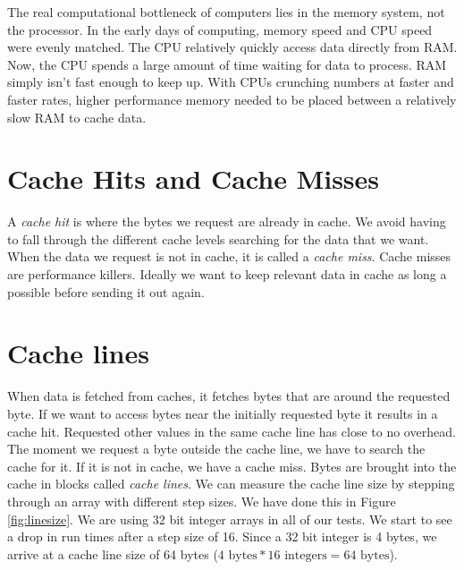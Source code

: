 
The real computational bottleneck of computers lies in the memory system, not the processor.  
In the early days of computing, memory speed and CPU speed were evenly matched.  
The CPU relatively quickly access data directly from RAM.  
Now, the CPU spends a large amount of time waiting for data to process.  
RAM simply isn't fast enough to keep up.  With CPUs crunching numbers at faster and faster rates, higher performance memory needed to be placed between a relatively slow RAM to cache data.  


\section*{Cache Hits and Cache Misses}
A \emph{cache hit} is where the bytes we request are already in cache.  We avoid having to fall through the different cache levels searching for the data that we want.  When the data we request is not in cache, it is called a \emph{cache miss}.  
Cache misses are performance killers.  Ideally we want to keep relevant data in cache as long a possible before sending it out again.

\section*{Cache lines}
When data is fetched from caches, it fetches bytes that are around the requested byte.  
If we want to access bytes near the initially requested byte it results in a cache hit.
Requested other values in the same cache line has close to no overhead.
The moment we request a byte outside the cache line, we have to search the cache for it.  If it is not in cache, we have a cache miss.
Bytes are brought into the cache in blocks called \emph{cache lines}.
We can measure the cache line size by stepping through an array with different step sizes.
We have done this in Figure \ref{fig:linesize}.  We are using 32 bit integer arrays in all of our tests.
We start to see a drop in run times after a step size of 16.
Since a 32 bit integer is 4 bytes, we arrive at a cache line size of 64 bytes ($4 \mbox{~bytes} * 16 \mbox{~integers} = 64 \mbox{~bytes}$).

